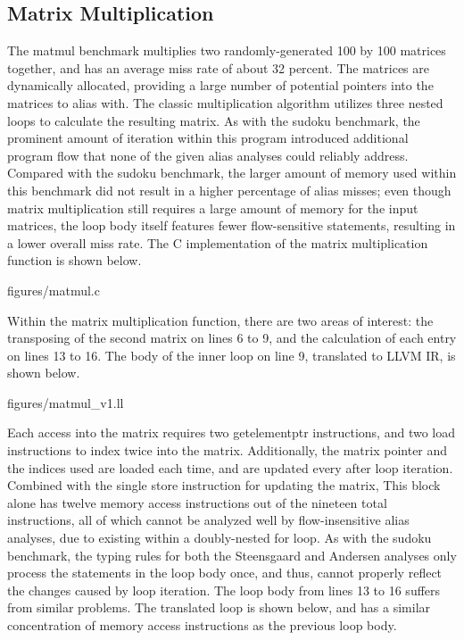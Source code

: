 \subsection{Matrix Multiplication}
The matmul benchmark multiplies two randomly-generated 100 by 100 matrices together, and has an average miss rate of about 32 percent. The matrices are dynamically allocated, providing a large number of potential pointers into the matrices to alias with. The classic multiplication algorithm utilizes three nested loops to calculate the resulting matrix. As with the sudoku benchmark, the prominent amount of iteration within this program introduced additional program flow that none of the given alias analyses could reliably address. Compared with the sudoku benchmark, the larger amount of memory used within this benchmark did not result in a higher percentage of alias misses; even though matrix multiplication still requires a large amount of memory for the input matrices, the loop body itself features fewer flow-sensitive statements, resulting in a lower overall miss rate. The C implementation of the matrix multiplication function is shown below.

 {figures/matmul.c}

Within the matrix multiplication function, there are two areas of interest: the transposing of the second matrix on lines 6 to 9, and the calculation of each entry on lines 13 to 16. The body of the inner loop on line 9, translated to LLVM IR, is shown below.

 {figures/matmul\_v1.ll}

Each access into the matrix requires two getelementptr instructions, and two load instructions to index twice into the matrix. Additionally, the matrix pointer and the indices used are loaded each time, and are updated every after loop iteration. Combined with the single store instruction for updating the matrix, This block alone has twelve memory access instructions out of the nineteen total instructions, all of which cannot be analyzed well by flow-insensitive alias analyses, due to existing within a doubly-nested for loop. As with the sudoku benchmark, the typing rules for both the Steensgaard and Andersen analyses only process the statements in the loop body once, and thus, cannot properly reflect the changes caused by loop iteration. The loop body from lines 13 to 16 suffers from similar problems. The translated loop is shown below, and has a similar concentration of memory access instructions as the previous loop body.


